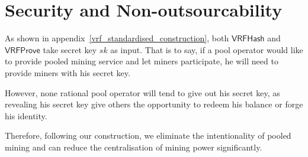 \section{Security and Non-outsourcability}


As shown in appendix~\ref{vrf_standardised_construction}, both $\mathsf{VRFHash}$ and $\mathsf{VRFProve}$ take secret key $sk$ as input.
That is to say, if a pool operator would like to provide pooled mining service and let miners participate, he will need to provide miners with his secret key.

However, none rational pool operator will tend to give out his secret key, as revealing his secret key give others the opportunity to redeem his balance or forge his identity.

Therefore, following our construction, we eliminate the intentionality of pooled mining and can reduce the centralisation of mining power significantly.
